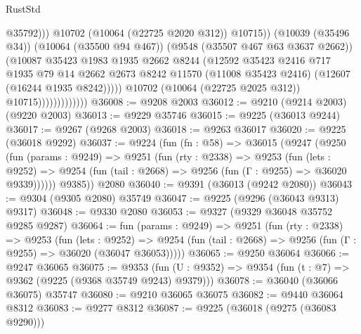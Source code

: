 \begin{lexlean}{RustStd}
\begin{coremodule}
                                          @35792)))
                                    @10702
                                    (@10064 (@22725 @2020 @312))
                                    @10715))
                                (@10039 (@35496 @34))
                                (@10064 (@35500 @94 @467))
                                (@9548 (@35507 @467 @63 @3637 @2662))
                                (@10087
                                  @35423
                                  @1983
                                  @1935
                                  @2662
                                  @8244
                                  (@12592
                                    @35423
                                    @2416
                                    @717
                                    @1935
                                    @79
                                    @14
                                    @2662
                                    @2673
                                    @8242
                                    @11570
                                    (@11008 @35423 @2416)
                                    (@12607 (@16244 @1935 @8242)))))
                              @10702
                              (@10064 (@22725 @2025 @312))
                              @10715)))))))))))))
@36008 := @9208 @2003
@36012 := @9210 (@9214 @2003) (@9220 @2003)
@36013 := @9229 @35746
@36015 := @9225 (@36013 @9244)
@36017 := @9267 (@9268 @2003)
@36018 := @9263 @36017
@36020 := @9225 (@36018 @9292)
@36037 := @9224
    (fun (fn : @58) =>
    @36015
      (@9247
        (@9250
          (fun (params : @9249) =>
          @9251
            (fun (rty : @2338) =>
            @9253
              (fun (lets : @9252) =>
              @9254 (fun (tail : @2668) => @9256 (fun (Γ : @9255) => @36020 @9339))))))
        @9385))
    @2080
@36040 := @9391 (@36013 (@9242 @2080))
@36043 := @9304 (@9305 @2080) @35749
@36047 := @9225 (@9296 (@36043 @9313) @9317)
@36048 := @9330 @2080
@36053 := @9327 (@9329 @36048 @35752 @9285 @9287)
@36064 := fun (params : @9249) =>
  @9251
    (fun (rty : @2338) =>
    @9253
      (fun (lets : @9252) =>
      @9254 (fun (tail : @2668) => @9256 (fun (Γ : @9255) => @36020 (@36047 @36053)))))
@36065 := @9250 @36064
@36066 := @9247 @36065
@36075 := @9353
    (fun (U : @9352) => @9354 (fun (t : @7) => @9362 (@9225 (@9368 @35749 @9243) @9379)))
@36078 := @36040 (@36066 @36075) @35747
@36080 := @9210 @36065 @36075
@36082 := @9440 @36064 @8312
@36083 := @9277 @8312
@36087 := @9225 (@36018 (@9275 (@36083 @9290)))

\end{coremodule}
\end{lexlean}
